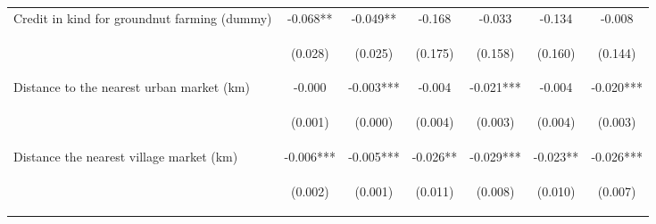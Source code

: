 \begin{center}
\begin{tabular}{lcccccc}
Credit in kind for groundnut farming (dummy) & -0.068** & -0.049** & -0.168 & -0.033 & -0.134 & -0.008 \\
\vspace{4pt} & \begin{footnotesize}(0.028)\end{footnotesize} & \begin{footnotesize}(0.025)\end{footnotesize} & \begin{footnotesize}(0.175)\end{footnotesize} & \begin{footnotesize}(0.158)\end{footnotesize} & \begin{footnotesize}(0.160)\end{footnotesize} & \begin{footnotesize}(0.144)\end{footnotesize} \\
Distance to the nearest urban market (km) & -0.000 & -0.003*** & -0.004 & -0.021*** & -0.004 & -0.020*** \\
\vspace{4pt} & \begin{footnotesize}(0.001)\end{footnotesize} & \begin{footnotesize}(0.000)\end{footnotesize} & \begin{footnotesize}(0.004)\end{footnotesize} & \begin{footnotesize}(0.003)\end{footnotesize} & \begin{footnotesize}(0.004)\end{footnotesize} & \begin{footnotesize}(0.003)\end{footnotesize} \\
Distance the nearest village market (km) & -0.006*** & -0.005*** & -0.026** & -0.029*** & -0.023** & -0.026*** \\
\vspace{4pt} & \begin{footnotesize}(0.002)\end{footnotesize} & \begin{footnotesize}(0.001)\end{footnotesize} & \begin{footnotesize}(0.011)\end{footnotesize} & \begin{footnotesize}(0.008)\end{footnotesize} & \begin{footnotesize}(0.010)\end{footnotesize} & \begin{footnotesize}(0.007)\end{footnotesize} \\

\end{tabular}
\end{center}
